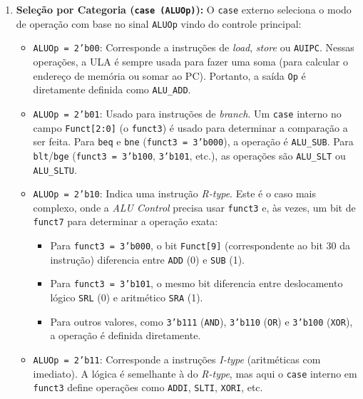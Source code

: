 \documentclass[12pt]{article}
\begin{document}
\begin{enumerate}
    \item \textbf{Seleção por Categoria (\texttt{case (ALUOp)}):}  
    O \texttt{case} externo seleciona o modo de operação com base no sinal \texttt{ALUOp} vindo do controle principal:
    \begin{itemize}
        \item \texttt{ALUOp = 2'b00}: Corresponde a instruções de \textit{load}, \textit{store} ou \texttt{AUIPC}. Nessas operações, a ULA é sempre usada para fazer uma soma (para calcular o endereço de memória ou somar ao PC). Portanto, a saída \texttt{Op} é diretamente definida como \texttt{ALU\_ADD}.
        
        \item \texttt{ALUOp = 2'b01}: Usado para instruções de \textit{branch}. Um \texttt{case} interno no campo \texttt{Funct[2:0]} (o \texttt{funct3}) é usado para determinar a comparação a ser feita.  
        Para \texttt{beq} e \texttt{bne} (\texttt{funct3 = 3'b000}), a operação é \texttt{ALU\_SUB}.  
        Para \texttt{blt}/\texttt{bge} (\texttt{funct3 = 3'b100}, \texttt{3'b101}, etc.), as operações são \texttt{ALU\_SLT} ou \texttt{ALU\_SLTU}.
        
        \item \texttt{ALUOp = 2'b10}: Indica uma instrução \textit{R-type}. Este é o caso mais complexo, onde a \textit{ALU Control} precisa usar \texttt{funct3} e, às vezes, um bit de \texttt{funct7} para determinar a operação exata:
        \begin{itemize}
            \item Para \texttt{funct3 = 3'b000}, o bit \texttt{Funct[9]} (correspondente ao bit 30 da instrução) diferencia entre \texttt{ADD} (0) e \texttt{SUB} (1).
            \item Para \texttt{funct3 = 3'b101}, o mesmo bit diferencia entre deslocamento lógico \texttt{SRL} (0) e aritmético \texttt{SRA} (1).
            \item Para outros valores, como \texttt{3'b111} (\texttt{AND}), \texttt{3'b110} (\texttt{OR}) e \texttt{3'b100} (\texttt{XOR}), a operação é definida diretamente.
        \end{itemize}
        
        \item \texttt{ALUOp = 2'b11}: Corresponde a instruções \textit{I-type} (aritméticas com imediato). A lógica é semelhante à do \textit{R-type}, mas aqui o \texttt{case} interno em \texttt{funct3} define operações como \texttt{ADDI}, \texttt{SLTI}, \texttt{XORI}, etc.
    \end{itemize}
\end{enumerate}
\end{document}
